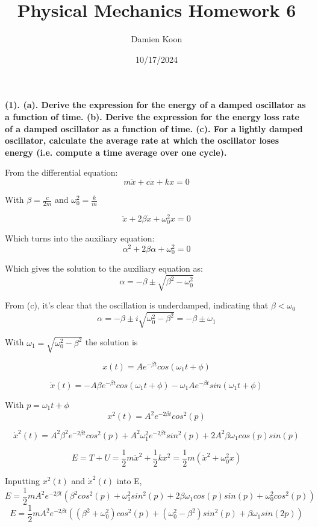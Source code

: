\documentclass[12pt]{article}
\title{Physical Mechanics Homework 6}
\date{10/17/2024}
\author{Damien Koon}
\begin{document}
\maketitle

\newpage
\textbf{
(1). \newline
(a). Derive the expression for the energy of a damped oscillator as a function of time. \newline
(b). Derive the expression for the energy loss rate of a damped oscillator as a function
of time. \newline
(c). For a lightly damped oscillator, calculate the average rate at which the oscillator
loses energy (i.e. compute a time average over one cycle). \newline
}

From the differential equation:
$$
m \ddot{x} + c \dot{x} + k x = 0
$$

With $\beta = \frac{c}{2m}$ and $\omega_0^2 = \frac{k}{m}$

$$
\ddot{x} + 2 \beta \dot{x} + \omega_0^2 x = 0
$$

Which turns into the auxiliary equation:
$$
\alpha^2 + 2 \beta \alpha + \omega_0^2 = 0
$$

Which gives the solution to the auxiliary equation as:
$$
\alpha = - \beta \pm \sqrt{\beta^2 - \omega_0^2}
$$

From (c), it's clear that the oscillation is underdamped, indicating that $\beta  < \omega_0$
$$
\alpha = - \beta \pm i \sqrt{\omega_0^2 - \beta^2} = - \beta \pm \omega_1
$$

With $\omega_1 = \sqrt{\omega_0^2 - \beta^2}$ the solution is 

$$
x(t) = A e^{- \beta t} cos(\omega_1 t + \phi)
$$

$$
\dot{x}(t) = - A \beta e^{- \beta t} cos(\omega_1 t + \phi) - \omega_1 A e^{- \beta t} sin(\omega_1 t + \phi)
$$

With $p = \omega_1 t + \phi$
$$
x^2(t) = A^2 e^{-2 \beta t} cos^2(p)
$$

$$
\dot{x}^2(t) = A^2 \beta^2 e^{-2 \beta t} cos^2(p) + A^2 \omega_1^2 e^{-2 \beta t} sin^2(p) + 2 A^2 \beta \omega_1 cos(p) sin(p)
$$

$$
E = T + U = \frac{1}{2} m \dot{x}^2 + \frac{1}{2}k x^2 = \frac{1}{2}m(\dot{x}^2 + \omega_0^2 x)
$$

Inputting $x^2(t)$ and $\dot{x}^2(t)$ into E,
$$
E = \frac{1}{2} m A^2 e^{-2 \beta t}( \beta^2 cos^2(p) + \omega_1^2 sin^2(p) + 2 \beta \omega_1 cos(p) sin(p) + \omega_0^2 cos^2(p))
$$
\newpage
$$
E = \frac{1}{2} m A^2 e^{-2 \beta t} ( (\beta^2 + \omega_0^2)cos^2(p) + (\omega_0^2 - \beta^2)sin^2(p) + \beta \omega_1 sin(2p))
$$
\end{document}

